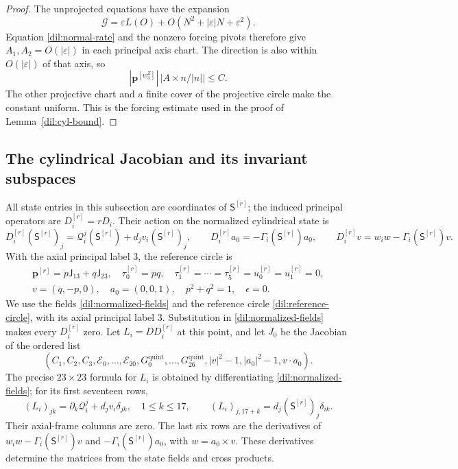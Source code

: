 \documentclass[11pt,a4paper]{article}
\numberwithin{equation}{section}
\theoremstyle{plain}
\theoremstyle{definition}
\theoremstyle{remark}
\begin{document}
\begin{proof}
The unprojected equations have the
expansion
\begin{equation}\label{adil:unprojected-forcing}
 \boldsymbol{\mathcal G}=\varepsilon L(O)
             +O(N^2+|\varepsilon|N+\varepsilon^2).
\end{equation}
Equation \eqref{dil:normal-rate} and the nonzero forcing pivots
therefore give $A_1,A_2=O(|\varepsilon|)$ in each principal axis
chart. The direction is also within $O(|\varepsilon|)$ of that axis,
so
\[
                  |\boldsymbol p^{[w_3^Z]}|\,|A\times n/|n||\le C.
\]
The other projective chart and a finite cover of the projective
circle make the constant uniform.  This is the
forcing estimate used in the proof of Lemma~\ref{dil:cyl-bound}.
\end{proof}

\subsection{The cylindrical Jacobian and its invariant subspaces}
\label{adil:cylindrical-matrices}
All state entries in this subsection are coordinates of $\mathsf S^{[r]}$; the induced principal operators are $D_i^{[r]}=rD_i$.
Their action on the normalized cylindrical state is
\begin{equation}\label{dil:normalized-fields}
 D_i^{[r]}(\mathsf S^{[r]})_j=\mathcal Q_i^j(\mathsf S^{[r]})+d_jv_i(\mathsf S^{[r]})_j,\qquad
 D_i^{[r]} a_0=-\Gamma_i(\mathsf S^{[r]})a_0,\qquad
 D_i^{[r]} v=w_iw-\Gamma_i(\mathsf S^{[r]})v.
\end{equation}
With the axial principal label $3$, the reference circle is
\begin{equation}\label{dil:reference-circle}
 \begin{gathered}
 \boldsymbol p^{[r]}=p\mathsf J_{13}+q\mathsf J_{23},\quad \tau_0^{[r]}=pq,\quad
 \tau_1^{[r]}=\cdots=\tau_5^{[r]}=u_0^{[r]}=u_1^{[r]}=0,\\
 v=(q,-p,0),\quad a_0=(0,0,1),\quad
 p^2+q^2=1,\quad\epsilon=0.
 \end{gathered}
\end{equation}
We use the fields \eqref{dil:normalized-fields} and the reference
circle \eqref{dil:reference-circle}, with its axial principal label $3$.
Substitution in \eqref{dil:normalized-fields} makes every
$D_i^{[r]}$ zero.  Let $L_i=DD_i^{[r]}$ at this point, and let
$J_0$ be the Jacobian of the ordered list
\[
 (C_1,C_2,C_3,\mathcal E_0,\ldots,\mathcal E_{20},G_0^{\mathrm{quint}},\ldots,G_{26}^{\mathrm{quint}},
                 |v|^2-1,|a_0|^2-1,v\cdot a_0).
\]
The precise $23\times23$ formula for $L_i$ is obtained by differentiating
\eqref{dil:normalized-fields}; for its first seventeen rows,
\begin{equation}\label{dil:L-matrix-definition}
 (L_i)_{jk}=\partial_k\mathcal Q_i^j+d_jv_i\delta_{jk},\quad 1\le k\le17,
 \qquad (L_i)_{j,17+k}=d_j(\mathsf S^{[r]})_j\delta_{ik}.
\end{equation}
Their axial-frame columns are zero.  The last six rows are the
derivatives of $w_iw-\Gamma_i(\mathsf S^{[r]})v$ and $-\Gamma_i(\mathsf S^{[r]})a_0$, with
$w=a_0\times v$.  These derivatives determine the matrices from the state fields and cross products.
\end{document}
